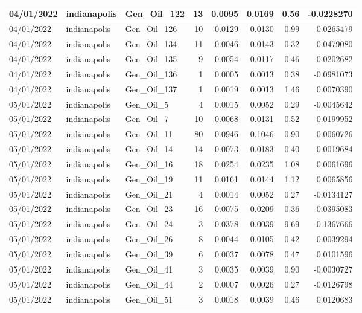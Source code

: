 \documentclass[
  letterpaper,
  DIV=11,
  numbers=noendperiod]{scrartcl}
\begin{document}
\begin{tabular}{l|l|l|r|r|r|r|r}
\hline
04/01/2022 & indianapolis & Gen\_Oil\_122 & 13 & 0.0095 & 0.0169 & 0.56 & -0.0228270\\
\hline
04/01/2022 & indianapolis & Gen\_Oil\_126 & 10 & 0.0129 & 0.0130 & 0.99 & -0.0265479\\
\hline
04/01/2022 & indianapolis & Gen\_Oil\_134 & 11 & 0.0046 & 0.0143 & 0.32 & 0.0479080\\
\hline
04/01/2022 & indianapolis & Gen\_Oil\_135 & 9 & 0.0054 & 0.0117 & 0.46 & 0.0202682\\
\hline
04/01/2022 & indianapolis & Gen\_Oil\_136 & 1 & 0.0005 & 0.0013 & 0.38 & -0.0981073\\
\hline
04/01/2022 & indianapolis & Gen\_Oil\_137 & 1 & 0.0019 & 0.0013 & 1.46 & 0.0070390\\
\hline
05/01/2022 & indianapolis & Gen\_Oil\_5 & 4 & 0.0015 & 0.0052 & 0.29 & -0.0045642\\
\hline
05/01/2022 & indianapolis & Gen\_Oil\_7 & 10 & 0.0068 & 0.0131 & 0.52 & -0.0199952\\
\hline
05/01/2022 & indianapolis & Gen\_Oil\_11 & 80 & 0.0946 & 0.1046 & 0.90 & 0.0060726\\
\hline
05/01/2022 & indianapolis & Gen\_Oil\_14 & 14 & 0.0073 & 0.0183 & 0.40 & 0.0019684\\
\hline
05/01/2022 & indianapolis & Gen\_Oil\_16 & 18 & 0.0254 & 0.0235 & 1.08 & 0.0061696\\
\hline
05/01/2022 & indianapolis & Gen\_Oil\_19 & 11 & 0.0161 & 0.0144 & 1.12 & 0.0065856\\
\hline
05/01/2022 & indianapolis & Gen\_Oil\_21 & 4 & 0.0014 & 0.0052 & 0.27 & -0.0134127\\
\hline
05/01/2022 & indianapolis & Gen\_Oil\_23 & 16 & 0.0075 & 0.0209 & 0.36 & -0.0395083\\
\hline
05/01/2022 & indianapolis & Gen\_Oil\_24 & 3 & 0.0378 & 0.0039 & 9.69 & -0.1367666\\
\hline
05/01/2022 & indianapolis & Gen\_Oil\_26 & 8 & 0.0044 & 0.0105 & 0.42 & -0.0039294\\
\hline
05/01/2022 & indianapolis & Gen\_Oil\_39 & 6 & 0.0037 & 0.0078 & 0.47 & 0.0101596\\
\hline
05/01/2022 & indianapolis & Gen\_Oil\_41 & 3 & 0.0035 & 0.0039 & 0.90 & -0.0030727\\
\hline
05/01/2022 & indianapolis & Gen\_Oil\_44 & 2 & 0.0007 & 0.0026 & 0.27 & -0.0126798\\
\hline
05/01/2022 & indianapolis & Gen\_Oil\_51 & 3 & 0.0018 & 0.0039 & 0.46 & 0.0120683\\

\end{tabular}
\end{document}

